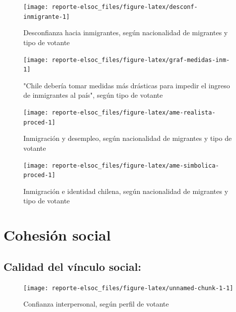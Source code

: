 \documentclass[
  12pt,
]{book}
\begin{document}
\begin{figure}

{\centering \texttt{[image: reporte-elsoc\_files/figure-latex/desconf-inmigrante-1]} 

}

\caption{Desconfianza hacia inmigrantes, según nacionalidad de migrantes y tipo de votante}\label{fig:desconf-inmigrante}
\end{figure}

\begin{figure}

{\centering \texttt{[image: reporte-elsoc\_files/figure-latex/graf-medidas-inm-1]} 

}

\caption{"Chile debería tomar medidas más
drásticas para impedir el ingreso
de inmigrantes al país", según tipo de votante}\label{fig:graf-medidas-inm}
\end{figure}

\begin{figure}

{\centering \texttt{[image: reporte-elsoc\_files/figure-latex/ame-realista-proced-1]} 

}

\caption{Inmigración y desempleo, según nacionalidad de migrantes y tipo de votante}\label{fig:ame-realista-proced}
\end{figure}

\begin{figure}

{\centering \texttt{[image: reporte-elsoc\_files/figure-latex/ame-simbolica-proced-1]} 

}

\caption{Inmigración e identidad chilena, según nacionalidad de migrantes y tipo de votante}\label{fig:ame-simbolica-proced}
\end{figure}

\hypertarget{cohesiuxf3n-social}{%
\chapter{Cohesión social}\label{cohesiuxf3n-social}}

\hypertarget{calidad-del-vuxednculo-social}{%
\section{Calidad del vínculo social:}\label{calidad-del-vuxednculo-social}}

\begin{figure}

{\centering \texttt{[image: reporte-elsoc\_files/figure-latex/unnamed-chunk-1-1]} 

}

\caption{Confianza interpersonal, según perfil de votante}\label{fig:unnamed-chunk-1}
\end{figure}
\end{document}
